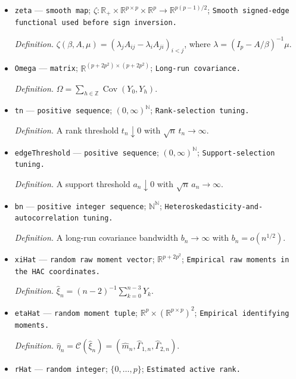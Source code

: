 \documentclass{article}
\begin{document}
\begin{itemize}
  \item \texttt{zeta} --- \texttt{smooth map}; \(\zeta:\mathbb R_{+}\times\mathbb R^{p\times p}\times\mathbb R^p\to\mathbb R^{p(p-1)/2}\); \texttt{Smooth signed-\allowbreak{}edge functional used before sign inversion.}
  \par\smallskip\noindent\emph{Definition.} \(\zeta(\beta,A,\mu)=(\lambda_jA_{ij}-\lambda_iA_{ji})_{i<j}\), where \(\lambda=(I_p-A/\beta)^{-1}\mu\).
  \item \texttt{Omega} --- \texttt{matrix}; \(\mathbb R^{(p+2p^2)\times(p+2p^2)}\); \texttt{Long-\allowbreak{}run covariance.}
  \par\smallskip\noindent\emph{Definition.} \(\Omega=\sum_{h\in\mathbb Z}\operatorname{Cov}(Y_0,Y_h)\).
  \item \texttt{tn} --- \texttt{positive sequence}; \((0,\infty)^{\mathbb N}\); \texttt{Rank-\allowbreak{}selection tuning.}
  \par\smallskip\noindent\emph{Definition.} A rank threshold \(t_n\downarrow0\) with \(\sqrt n\,t_n\to\infty\).
  \item \texttt{edgeThreshold} --- \texttt{positive sequence}; \((0,\infty)^{\mathbb N}\); \texttt{Support-\allowbreak{}selection tuning.}
  \par\smallskip\noindent\emph{Definition.} A support threshold \(a_n\downarrow0\) with \(\sqrt n\,a_n\to\infty\).
  \item \texttt{bn} --- \texttt{positive integer sequence}; \(\mathbb N^{\mathbb N}\); \texttt{Heteroskedasticity-\allowbreak{}and-\allowbreak{}autocorrelation tuning.}
  \par\smallskip\noindent\emph{Definition.} A long-run covariance bandwidth \(b_n\to\infty\) with \(b_n=o(n^{1/2})\).
  \item \texttt{xiHat} --- \texttt{random raw moment vector}; \(\mathbb R^{p+2p^2}\); \texttt{Empirical raw moments in the HAC coordinates.}
  \par\smallskip\noindent\emph{Definition.} \(\widehat\xi_n=(n-2)^{-1}\sum_{k=0}^{n-3}Y_k\).
  \item \texttt{etaHat} --- \texttt{random moment tuple}; \(\mathbb R^p\times(\mathbb R^{p\times p})^2\); \texttt{Empirical identifying moments.}
  \par\smallskip\noindent\emph{Definition.} \(\widehat\eta_n=\mathcal C(\widehat\xi_n)=(\widehat m_n,\widehat\Gamma_{1,n},\widehat\Gamma_{2,n})\).
  \item \texttt{rHat} --- \texttt{random integer}; \(\{0,\ldots,p\}\); \texttt{Estimated active rank.}

\end{itemize}
\end{document}
